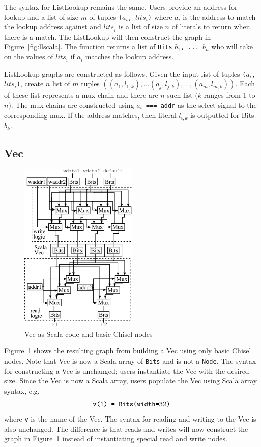 The syntax for ListLookup remains the same. Users provide an address
for lookup and a list of size $m$ of tuples {\tt ($a_i$, $lits_i$)}
where {\tt $a_i$} is the address to match the lookup address against and
{\tt $lits_i$} is a list of size $n$ of literals to return when there
is a match. The ListLookup will then construct the graph in
Figure~\ref{fig:llscala}. The function returns a list of {\tt Bits}
{\tt $b_1$, ... $b_n$} who will take on the values of {\tt $lits_i$} if
{\tt $a_i$} matches the lookup address.

ListLookup graphs are constructed as follows. Given the input list of
tuples {\tt ($a_i$, $lits_i$)}, create $n$ list of $m$ tuples
{\tt $( (a_1, l_{1, k}), ... (a_j, l_{j, k}), ..., (a_m, l_{m, k})
  )$}. Each of these list represents a mux chain and there are $n$
such list ($k$ ranges from 1 to $n$). The mux chains are constructed
using {\tt $a_i$ === addr} as the select signal to the corresponding
mux. If the address matches, then literal {\tt $l_{i, k}$} is outputted
for Bits $b_k$.

\subsection{Vec}
\begin{figure}[htb]
\centering
\includegraphics[width=0.5\textwidth]{figures/vecscala.pdf}
\caption{Vec as Scala code and basic Chisel nodes}
\label{fig:vecscala}
\end{figure}

Figure~\ref{fig:vecscala} shows the resulting graph from building a
Vec using only basic Chisel nodes. Note that Vec is now a Scala array
of {\tt Bits} and is not a {\tt Node}. The syntax for constructing a
Vec is unchanged; users instantiate the Vec with the desired
size. Since the Vec is now a Scala array, users populate the Vec using
Scala array syntax, e.g.
\begin{align*}
  \text{ \tt{v(1) = Bits(width=32)} }
\end{align*}
where {\tt v} is the name of the Vec. The syntax for reading and
writing to the Vec is also unchanged. The difference is that reads
and writes will now construct the graph in Figure~\ref{fig:vecscala}
instead of instantiating special read and write nodes.

